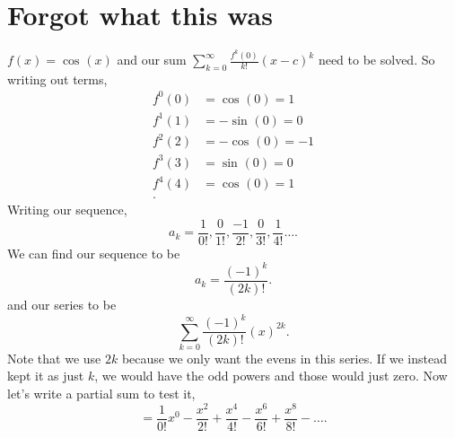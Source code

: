 \documentclass{report}
\begin{document}
\section{Forgot what this was}
	 $ f\left( x \right) =\cos^{  } \left( x \right)  $ and our sum $ \sum_{ k=0 } ^{ \infty } \frac{ f^{ k }\left( 0 \right)  }{ k! }\left( x-c \right) ^{ k } $ need to be solved. So writing out terms,
	 \begin{align*}
			f^{ 0 }\left( 0 \right) &= \cos^{  } \left( 0 \right) =1 \\
			f^{ 1 }\left( 1 \right) &= -\sin^{  } \left( 0 \right) =0 \\
			f^{ 2 }\left( 2 \right) &= -\cos^{  } \left( 0 \right) =-1 \\
			f^{ 3 }\left( 3 \right) &= \sin^{  } \left( 0 \right) =0 \\
			f^{ 4 }\left( 4 \right) &= \cos^{  } \left( 0 \right) =1 \\
	 .\end{align*}
	 Writing our sequence,
	 \[
		a_k=\frac{ 1 }{ 0! } ,\frac{ 0 }{ 1! } ,\frac{ -1 }{ 2! } ,\frac{ 0 }{ 3! } ,\frac{ 1 }{ 4! }\ldots
	 .\] 
	 We can find our sequence to be 
	 \[
	 a_k=\frac{ \left( -1 \right) ^{ k } }{ \left( 2k \right) ! }
	 .\] 
	 and our series to be 
	 \[
	 \sum_{ k=0 } ^{ \infty } \frac{ \left( -1 \right) ^{ k } }{ \left( 2k \right) ! }\left( x \right) ^{ 2k }
	 .\] 
		Note that we use $ 2k $ because we only want the evens in this series. If we instead kept it as just $ k $, we would have the odd powers and those would just zero. Now let's write a partial sum to test it,
		\[
		=\frac{ 1 }{ 0! } x^{ 0 }-\frac{ x^2 }{ 2! } + \frac{ x^{ 4 } }{ 4! }-\frac{ x^{ 6 } }{ 6! } + \frac{ x^{ 8 } }{ 8! } - \ldots
		.\] 




\end{document}
